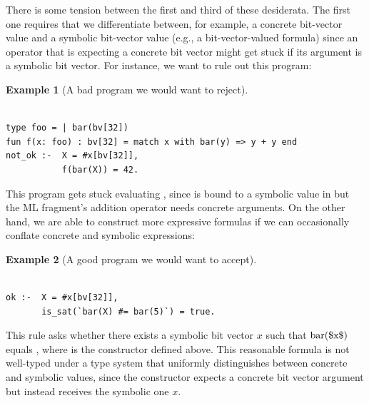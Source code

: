 \documentclass[acmsmall,screen,nonacm]{acmart}
\theoremstyle{definition}
\newtheorem{exmp}{Example}
\begin{document}
There is some tension between the first and third of these desiderata.
The first one requires that we differentiate between, for example, a concrete
bit-vector value and a symbolic bit-vector value (e.g., a bit-vector-valued
formula) since an operator that is expecting a concrete bit vector might get
stuck if its argument is a symbolic bit vector.
For instance, we want to rule out this program:
\begin{exmp}[A bad program we would want to reject]
\label{example:not_ok}
\begin{lstlisting}

type foo = | bar(bv[32])
fun f(x: foo) : bv[32] = match x with bar(y) => y + y end
not_ok :-  X = #x[bv[32]],
           f(bar(X)) = 42.
\end{lstlisting}
\end{exmp}
\noindent This program gets stuck evaluating , since  is
bound to a symbolic value in  but the ML fragment's addition operator
needs concrete arguments.
On the other hand, we are able to construct more expressive formulas if we can
occasionally conflate concrete and symbolic expressions:
\begin{exmp}[A good program we would want to accept]
\label{example:ok}
\begin{lstlisting}

ok :-  X = #x[bv[32]],
       is_sat(`bar(X) #= bar(5)`) = true.
\end{lstlisting}
\end{exmp}
\noindent This rule asks whether there exists a symbolic bit vector $x$ such
that $\ic{bar($x$)}$ equals , where  is the constructor
defined above.
This reasonable formula is not well-typed under a type system that uniformly
distinguishes between concrete and symbolic values, since the constructor
 expects a concrete bit vector argument but instead receives the
symbolic one $x$.
\end{document}
